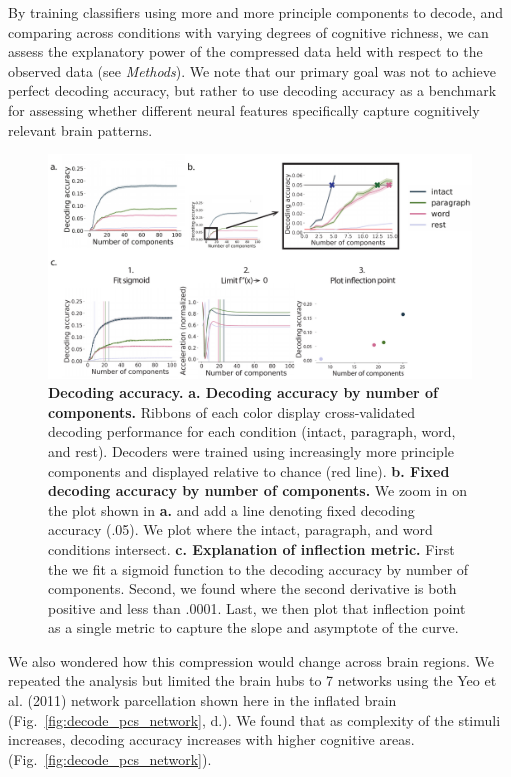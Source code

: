 
By training classifiers using more and more principle components to decode, and comparing across conditions with varying degrees of cognitive richness, we can assess the explanatory power of the compressed data held with respect to the observed data (see \textit{Methods}). We note that our primary goal was not to achieve perfect decoding accuracy, but rather to use decoding accuracy as a benchmark for assessing whether different neural features specifically capture cognitively relevant brain patterns.

\begin{figure}
  \centering
  \includegraphics[width=\textwidth]{figs/decode_interpret.pdf}
  \caption{\textbf{Decoding accuracy.} \textbf{a. Decoding accuracy by
      number of components.} Ribbons of each color display
    cross-validated decoding performance for each condition (intact,
    paragraph, word, and rest). Decoders were trained using
    increasingly more principle components and displayed relative to
    chance (red line). \textbf{b. Fixed decoding accuracy by number of
      components.} We zoom in on the plot shown in \textbf{a.} and add
    a line denoting fixed decoding accuracy (.05). We plot where the
    intact, paragraph, and word conditions intersect.
    \textbf{c. Explanation of inflection metric.} First the we fit a sigmoid function to the decoding accuracy by number of components. Second, we found where the second derivative is both positive and less than .0001. Last, we then plot that inflection point as a single metric to capture the slope and asymptote of the curve.}
    \label{fig:decode_interpret}
  \end{figure}




  We also wondered how this compression would change across brain regions.  We repeated the analysis but limited the brain hubs to 7 networks using the Yeo et al. (2011) network parcellation shown here in the inflated brain (Fig.~\ref{fig:decode_pcs_network}, d.). We found that as complexity of the stimuli increases, decoding accuracy increases
  with higher cognitive areas. (Fig.~\ref{fig:decode_pcs_network}).
  
